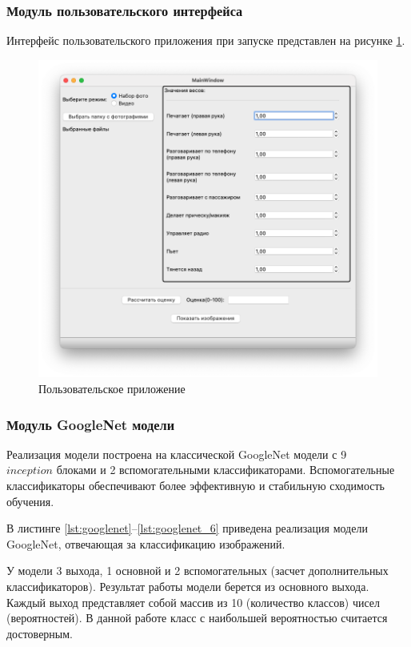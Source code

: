 \subsubsection{Модуль пользовательского интерфейса}
Интерфейс пользовательского приложения при запуске представлен на рисунке \ref{fig:example_app}.
\begin{figure}[H]
	\centering
	\includegraphics[scale=0.55]{img/example_app.png}
	\caption{Пользовательское приложение}
	\label{fig:example_app}
\end{figure}

\subsubsection{Модуль GoogleNet модели}
Реализация модели построена на классической GoogleNet модели с 9 \\$inception$ блоками и 2 вспомогательными классификаторами. Вспомогательные классификаторы обеспечивают более эффективную и стабильную сходимость обучения.

В листинге \ref{lst:googlenet}--\ref{lst:googlenet_6} приведена реализация модели GoogleNet, отвечающая за классификацию изображений.

У модели 3 выхода, 1 основной и 2 вспомогательных (засчет дополнительных классификаторов). Результат работы модели берется из основного выхода. Каждый выход представляет собой массив из 10 (количество классов) чисел (вероятностей). В данной работе класс с наибольшей вероятностью считается достоверным.

